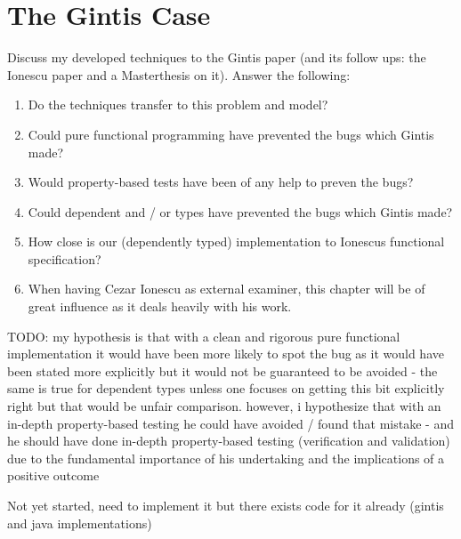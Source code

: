 \chapter{The Gintis Case}
\label{sec:gintis_case}
Discuss my developed techniques to the Gintis paper (and its follow ups: the Ionescu paper \cite{botta_functional_2011} and a Masterthesis \cite{evensen_extensible_2010} on it). Answer the following:

\begin{enumerate}
	\item Do the techniques transfer to this problem and model? 
	
	\item Could pure functional programming have prevented the bugs which Gintis made? 
	
	\item Would property-based tests have been of any help to preven the bugs?
	
	\item Could dependent and / or types have prevented the bugs which Gintis made? 
	
	\item How close is our (dependently typed) implementation to Ionescus functional specification? 
	
	\item When having Cezar Ionescu as external examiner, this chapter will be of great influence as it deals heavily with his work.

\end{enumerate}

TODO: my hypothesis is that with a clean and rigorous pure functional implementation it would have been more likely to spot the bug as it would have been stated more explicitly but it would not be guaranteed to be avoided - the same is true for dependent types unless one focuses on getting this bit explicitly right but that would be unfair comparison. however, i hypothesize that with an in-depth property-based testing he could have avoided / found that mistake - and he should have done in-depth property-based testing (verification and validation) due to the fundamental importance of his undertaking and the implications of a positive outcome

Not yet started, need to implement it but there exists code for it already (gintis and java implementations)

%
%
%
%

